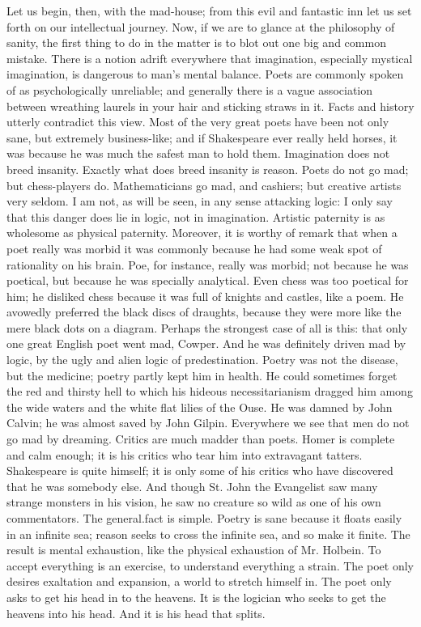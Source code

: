 \documentclass{book}
\begin{document}
Let us begin, then, with the mad-house; from this evil and fantastic inn let us set forth on our intellectual journey. Now, if we are to glance at the philosophy of sanity, the first thing to do in the matter is to blot out one big and common mistake. There is a notion adrift everywhere that imagination, especially mystical imagination, is dangerous to man’s mental balance. Poets are commonly spoken of as psychologically unreliable; and generally there is a vague association between wreathing laurels in your hair and sticking straws in it. Facts and history utterly contradict this view. Most of the very great poets have been not only sane, but extremely business-like; and if Shakespeare ever really held horses, it was because he was much the safest man to hold them. Imagination does not breed insanity. Exactly what does breed insanity is reason. Poets do not go mad; but chess-players do. Mathematicians go mad, and cashiers; but creative artists very seldom. I am not, as will be seen, in any sense attacking logic: I only say that this danger does lie in logic, not in imagination. Artistic paternity is as wholesome as physical paternity. Moreover, it is worthy of remark that when a poet really was morbid it was commonly because he had some weak spot of rationality on his brain. Poe, for instance, really was morbid; not because he was poetical, but because he was specially analytical. Even chess was too poetical for him; he disliked chess because it was full of knights and castles, like a poem. He avowedly preferred the black discs of draughts, because they were more like the mere black dots on a diagram. Perhaps the strongest case of all is this: that only one great English poet went mad, Cowper. And he was definitely driven mad by logic, by the ugly and alien logic of predestination. Poetry was not the disease, but the medicine; poetry partly kept him in health. He could sometimes forget the red and thirsty hell to which his hideous necessitarianism dragged him among the wide waters and the white flat lilies of the Ouse. He was damned by John Calvin; he was almost saved by John Gilpin. Everywhere we see that men do not go mad by dreaming. Critics are much madder than poets. Homer is complete and calm enough; it is his critics who tear him into extravagant tatters. Shakespeare is quite himself; it is only some of his critics who have discovered that he was somebody else. And though St. John the Evangelist saw many strange monsters in his vision, he saw no creature so wild as one of his own commentators. The general.fact is simple. Poetry is sane because it floats easily in an infinite sea; reason seeks to cross the infinite sea, and so make it finite. The result is mental exhaustion, like the physical exhaustion of Mr. Holbein. To accept everything is an exercise, to understand everything a strain. The poet only desires exaltation and expansion, a world to stretch himself in. The poet only asks to get his head in to the heavens. It is the logician who seeks to get the heavens into his head. And it is his head that splits.
\end{document}
